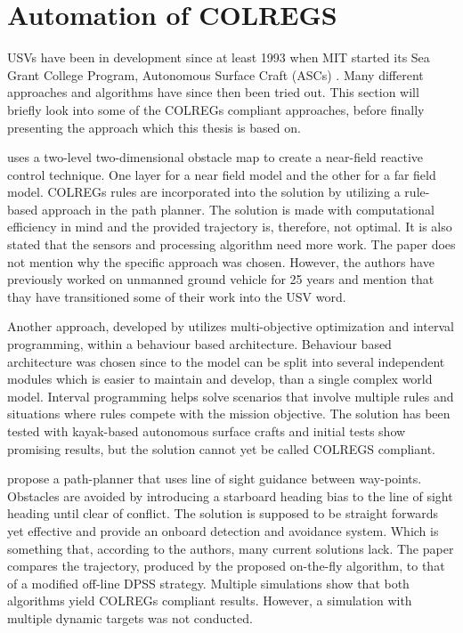\chapter{Automation of COLREGS}
USVs have been in development since at least 1993 when MIT started its Sea Grant College Program, Autonomous Surface Craft (ASCs) \cite{manley2008unmanned}. Many different approaches and algorithms have since then been tried out. This section will briefly look into some of the COLREGs compliant approaches, before finally presenting the approach which this thesis is based on.

\textcite{larson2007advances} uses a two-level two-dimensional obstacle map to create a near-field reactive control technique. One layer for a near field model and the other for a far field model. COLREGs rules are incorporated into the solution by utilizing a rule-based approach in the path planner. The solution is made with computational efficiency in mind and the provided trajectory is, therefore, not optimal. It is also stated that the sensors and processing algorithm need more work. The paper does not mention why the specific approach was chosen. However, the authors have previously worked on unmanned ground vehicle for 25 years and mention that thay have transitioned some of their work into the USV word.


Another approach, developed by \textcite{benjamin2004colregs,benjamin2006method} utilizes multi-objective optimization and interval programming, within a behaviour based architecture. Behaviour based architecture was chosen since  to the model can be split into several independent modules which is easier to maintain and develop, than a single complex world model.  Interval programming helps solve scenarios that involve  multiple rules and situations where rules compete with the mission objective. The solution has been tested with kayak-based autonomous surface crafts and initial tests show promising results, but the solution cannot yet be called COLREGS compliant.


\textcite{naeem2012colregs}
propose a path-planner that uses line of sight guidance between way-points. Obstacles are avoided by introducing a starboard heading bias to the line of sight heading until clear of conflict. The solution is supposed to be straight forwards yet effective and  provide an onboard detection and avoidance system. Which is something that, according to the authors, many current solutions lack. The paper compares the trajectory, produced by the proposed on-the-fly algorithm, to that of a modified off-line DPSS strategy. Multiple simulations show that both algorithms yield COLREGs compliant results. However, a simulation with multiple dynamic targets was not conducted.

